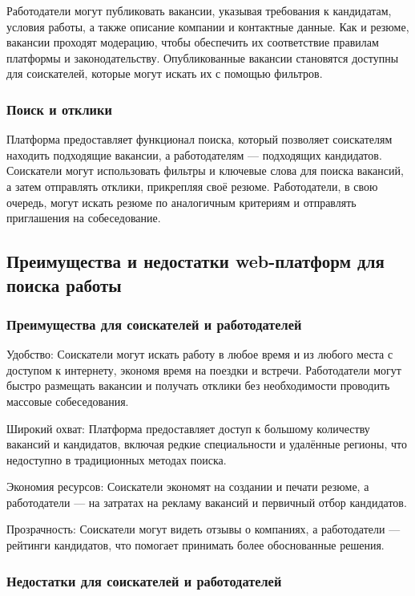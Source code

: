Работодатели могут публиковать вакансии, указывая требования к кандидатам, условия работы, а также описание компании и контактные данные. Как и резюме, вакансии проходят модерацию, чтобы обеспечить их соответствие правилам платформы и законодательству. Опубликованные вакансии становятся доступны для соискателей, которые могут искать их с помощью фильтров.

\subsubsection{Поиск и отклики}

Платформа предоставляет функционал поиска, который позволяет соискателям находить подходящие вакансии, а работодателям — подходящих кандидатов. Соискатели могут использовать фильтры и ключевые слова для поиска вакансий, а затем отправлять отклики, прикрепляя своё резюме. Работодатели, в свою очередь, могут искать резюме по аналогичным критериям и отправлять приглашения на собеседование.

\subsection{Преимущества и недостатки web-платформ для поиска работы}
\subsubsection{Преимущества для соискателей и работодателей}

Удобство: Соискатели могут искать работу в любое время и из любого места с доступом к интернету, экономя время на поездки и встречи. Работодатели могут быстро размещать вакансии и получать отклики без необходимости проводить массовые собеседования.

Широкий охват: Платформа предоставляет доступ к большому количеству вакансий и кандидатов, включая редкие специальности и удалённые регионы, что недоступно в традиционных методах поиска.

Экономия ресурсов: Соискатели экономят на создании и печати резюме, а работодатели — на затратах на рекламу вакансий и первичный отбор кандидатов.

Прозрачность: Соискатели могут видеть отзывы о компаниях, а работодатели — рейтинги кандидатов, что помогает принимать более обоснованные решения.

\subsubsection{Недостатки для соискателей и работодателей}

